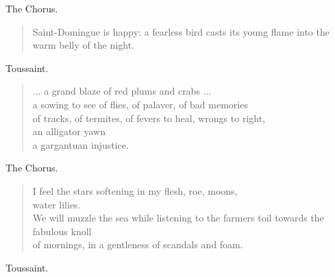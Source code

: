 \documentclass[letterpaper,article,12pt,oneside,notitlepage]{memoir}
\begin{document}
\begin{center}The Chorus.\end{center}

\begin{verse}
\indent Saint-Domingue is happy: a fearless bird casts its young flame into the warm belly of the night. \\
\end{verse}

\begin{center}Toussaint.\end{center}

\begin{verse}
... a grand blaze of red plums and crabs ... \\
\hspace{1cm} a sowing to see of flies, of palaver, of bad memories \\
\hspace{1cm} of tracks, of termites, of fevers to heal, wrongs to right, \\
\hspace{1cm} an alligator yawn \\
\hspace{1cm} a gargantuan injustice. \\
\end{verse}

\clearpage

\begin{center}The Chorus.\end{center}

\begin{verse}
I feel the stars softening in my flesh, roe, moons, \\
water lilies. \\
\hspace{1cm} We will muzzle the sea while listening to the farmers toil towards the fabulous knoll \\
of mornings, in a gentleness of scandals and foam. \\
\end{verse}

\begin{center}Toussaint.\end{center}
\end{document}
